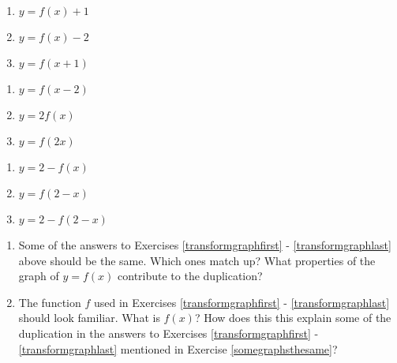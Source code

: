 \documentclass{ximera}
\begin{document}
\begin{multicols}{3}
\begin{enumerate}
\setcounter{enumi}{\value{HW}}

\item $y = f(x) + 1$ \label{transformgraphfirst}
\item $y = f(x) - 2$
\item $y = f(x+1)$

\setcounter{HW}{\value{enumi}}
\end{enumerate}
\end{multicols}

\begin{multicols}{3}
\begin{enumerate}
\setcounter{enumi}{\value{HW}}

\item $y = f(x - 2)$
\item $y = 2f(x)$
\item $y = f(2x)$

\setcounter{HW}{\value{enumi}}
\end{enumerate}
\end{multicols}

\begin{multicols}{3}
\begin{enumerate}
\setcounter{enumi}{\value{HW}}

\item $y = 2 - f(x)$
\item $y = f(2-x)$
\item $y = 2-f(2-x)$ \label{transformgraphlast}

\setcounter{HW}{\value{enumi}}
\end{enumerate}
\end{multicols}


\begin{enumerate}
\setcounter{enumi}{\value{HW}}

\item \label{somegraphsthesame} Some of the answers to Exercises \ref{transformgraphfirst} - \ref{transformgraphlast} above should be the same.  Which ones match up?  What properties of the graph of $y=f(x)$ contribute to the duplication?

\item  The function $f$ used in  Exercises \ref{transformgraphfirst} - \ref{transformgraphlast} should look familiar.  What is $f(x)$?  How does this this explain some of the duplication in the answers to Exercises \ref{transformgraphfirst} - \ref{transformgraphlast} mentioned in Exercise \ref{somegraphsthesame}?

\setcounter{HW}{\value{enumi}}
\end{enumerate}
\end{document}
